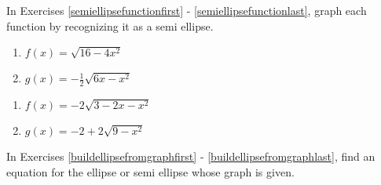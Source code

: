 In Exercises \ref{semiellipsefunctionfirst} - \ref{semiellipsefunctionlast}, graph each function by recognizing it as a semi ellipse.

\begin{multicols}{2}
\begin{enumerate}
\setcounter{enumi}{\value{HW}}

\item   $f(x) = \sqrt{16-4x^2}$ \label{semiellipsefunctionfirst}
\item   $g(x) = -\frac{1}{2} \sqrt{6x-x^2}$

\setcounter{HW}{\value{enumi}}
\end{enumerate}
\end{multicols}

\begin{multicols}{2}
\begin{enumerate}
\setcounter{enumi}{\value{HW}}

\item  $f(x) = -2\sqrt{3-2x-x^2}$
\item  $g(x) = -2 + 2\sqrt{9-x^2}$ \label{semiellipsefunctionlast}

\setcounter{HW}{\value{enumi}}
\end{enumerate}
\end{multicols}

\pagebreak

In Exercises \ref{buildellipsefromgraphfirst} - \ref{buildellipsefromgraphlast}, find an equation for the ellipse or semi ellipse whose graph is given.

